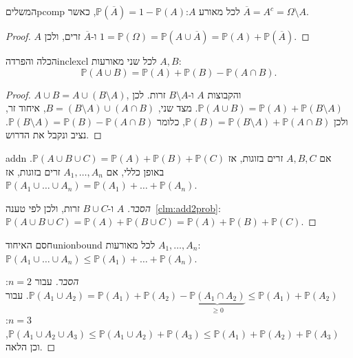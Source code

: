 \documentclass[11pt,a4paper]{report}
\newcommand{\comp}[1]{\overline{#1}}
\newcommand{\PP}{\mathbb{P}}
\begin{document}
\begin{claim}{המשלים}{pcomp}
לכל מאורע $A$:\quad $\PP(\comp A)=1-\PP(A)$, כאשר $\comp A=A^c=\Omega\setminus A$.
\end{claim}
\begin{proof}
$A$ ו-$\comp A$ זרים, ולכן $1=\PP(\Omega)=\PP(A\cup\comp A)=\PP(A)+\PP(\comp A)$.
\end{proof}

\begin{claim}{הכלה והפרדה}{inclexcl}
לכל שני מאורעות $A,B$:
\[
  \PP(A\cup B)=\PP(A)+\PP(B)-\PP(A\cap B).
\]
\end{claim}
\begin{proof}
$A\cup B=A\cup(B\setminus A)$, והקבוצות $A$ ו-$B\setminus A$ זרות. לכן $\PP(A\cup B)=\PP(A)+\PP(B\setminus A)$.
מצד שני, $B=(B\setminus A)\cup(A\cap B)$, איחוד זר, ולכן $\PP(B)=\PP(B\setminus A)+\PP(A\cap B)$, כלומר $\PP(B\setminus A)=\PP(B)-\PP(A\cap B)$. נציב ונקבל את הדרוש.
\end{proof}

\begin{center}
\end{center}

\begin{claim}{}{addn}
אם $A,B,C$ זרים בזוגות, אז $\PP(A\cup B\cup C)=\PP(A)+\PP(B)+\PP(C)$.
באופן כללי, אם $A_1,\dots,A_n$ זרים בזוגות, אז $\PP(A_1\cup\dots\cup A_n)=\PP(A_1)+\dots+\PP(A_n)$.
\end{claim}
\begin{proof}[הסבר]
$A$ ו-$B\cup C$ זרות, ולכן לפי טענה~\ref{clm:add2prob}: $\PP(A\cup B\cup C)=\PP(A)+\PP(B\cup C)=\PP(A)+\PP(B)+\PP(C)$.
\end{proof}

\begin{claim}{חסם האיחוד}{unionbound}
לכל מאורעות $A_1,\dots,A_n$:\quad $\PP(A_1\cup\dots\cup A_n)\le\PP(A_1)+\dots+\PP(A_n)$.
\end{claim}
\begin{proof}[הסבר]
עבור $n=2$: $\PP(A_1\cup A_2)=\PP(A_1)+\PP(A_2)-\underbrace{\PP(A_1\cap A_2)}_{\ge0}\le\PP(A_1)+\PP(A_2)$.
עבור $n=3$: $\PP(A_1\cup A_2\cup A_3)\le\PP(A_1\cup A_2)+\PP(A_3)\le\PP(A_1)+\PP(A_2)+\PP(A_3)$, וכן הלאה.
\end{proof}
\end{document}
